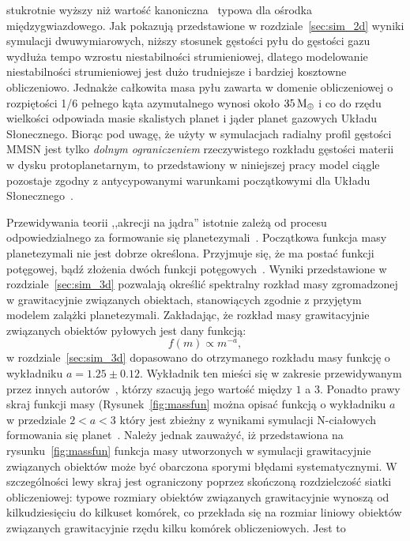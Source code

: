 stukrotnie wyższy niż wartość kanoniczna~\cite{FS03} typowa dla ośrodka
międzygwiazdowego. Jak pokazują przedstawione w rozdziale~\ref{sec:sim_2d}
wyniki symulacji dwuwymiarowych, niższy stosunek gęstości pyłu do gęstości gazu
wydłuża tempo wzrostu niestabilności strumieniowej, dlatego modelowanie
niestabilności strumieniowej jest  dużo trudniejsze i bardziej kosztowne
obliczeniowo.  Jednakże całkowita masa pyłu zawarta w domenie obliczeniowej o
rozpiętości 1/6 pełnego kąta azymutalnego wynosi około $35\hbox{$\mathrm{\thinspace M_{\oplus}}$}$ i co do rzędu
wielkości odpowiada masie skalistych planet i jąder planet gazowych Układu
Słonecznego. Biorąc pod uwagę, że użyty w symulacjach radialny profil gęstości
MMSN jest tylko \emph{dolnym ograniczeniem} rzeczywistego rozkładu gęstości
materii w dysku protoplanetarnym, to przedstawiony w niniejszej pracy model
ciągle pozostaje zgodny z antycypowanymi warunkami początkowymi dla Układu
Słonecznego~\cite{D07}.
\par Przewidywania teorii ,,akrecji na jądra'' istotnie zależą od procesu
odpowiedzialnego za formowanie się planetezymali~\cite{HBP13}. Początkowa
funkcja masy planetezymali nie jest dobrze określona. Przyjmuje się, że ma
postać funkcji potęgowej, bądź złożenia dwóch funkcji potęgowych~\cite{R03}.
Wyniki przedstawione w rozdziale~\ref{sec:sim_3d} pozwalają określić spektralny
rozkład masy zgromadzonej w grawitacyjnie związanych obiektach, stanowiących
zgodnie z przyjętym modelem zalążki planetezymali.  Zakładając, że rozkład masy
grawitacyjnie związanych obiektów pyłowych jest dany funkcją:
%
\begin{equation}
   f(m) \propto m^{-a},
\end{equation}
%
w rozdziale~\ref{sec:sim_3d} dopasowano do otrzymanego rozkładu masy funkcję o
wykładniku $a = 1.25\pm0.12$. Wykładnik ten mieści się w zakresie przewidywanym
przez innych
autorów~\cite{R03}, którzy szacują jego wartość między $1$ a $3$. Ponadto prawy
skraj funkcji masy (Rysunek~\ref{fig:massfun} można opisać funkcją o wykładniku
$a$ w przedziale $2 < a < 3$ który jest zbieżny z wynikami symulacji N-ciałowych
formowania się planet~\cite{MFFK98}.  Należy jednak zauważyć, iż przedstawiona
na rysunku~\ref{fig:massfun} funkcja masy utworzonych w symulacji grawitacyjnie
związanych obiektów może być obarczona sporymi błędami systematycznymi.
W szczególności lewy skraj jest ograniczony poprzez skończoną rozdzielczość
siatki obliczeniowej: typowe rozmiary obiektów związanych grawitacyjnie wynoszą
od kilkudziesięciu do kilkuset komórek, co przekłada się na rozmiar liniowy
obiektów związanych grawitacyjnie rzędu kilku komórek obliczeniowych. Jest to
